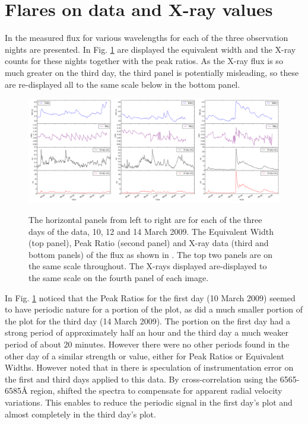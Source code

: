 \section{Flares on {\uves} data and X-ray values}
\protect\label{section:uvesflares}

In \citet[fig. 1 to fig. 3]{fuhrmeister11} the measured flux for various wavelengths for each of the three observation
nights are presented. In Fig. \ref{fig:uvrxp1} are displayed the {\ha} equivalent width and the X-ray counts for these
nights together with the peak ratios. As the X-ray flux is so much greater on the third day, the third panel is
potentially misleading, so these are re-displayed all to the same scale below in the bottom panel.

\begin{figure}[!htbp]
\begin{center}
\includegraphics[scale=0.18]{Figures/uvrx-onepic.png} \\
\end{center}   
\caption{The horizontal panels from left to right are for each of the three days of the {\uves} data, 10, 12 and 14
  March 2009.  The Equivalent Width (top panel), Peak Ratio (second panel) and X-ray data (third and bottom panels) of the
  {\ha} flux as shown in \citet[Fig. 1 to Fig.3]{fuhrmeister11}. The top two panels are on the same scale
  throughout. The X-rays displayed are-displayed to the same scale on the fourth panel of each image.}
 \protect\label{fig:uvrxp1}
\end{figure}

In Fig. \ref{fig:uvrxp1} {\Firstp} noticed that the Peak Ratios for the first day (10 March 2009) seemed to have periodic nature for a portion of
the plot, as did a much smaller portion of the plot for the third day (14 March 2009). The portion on the first day had
a strong period of approximately half an hour and the third day a much weaker period of about 20 minutes.  However there
were no other periods found in the other day of a similar strength or value, either for Peak Ratios or Equivalent
Widths. However {\Firstp} noted that in \citet[Section 4.1]{barnes14} there is speculation of instrumentation error on
the first and third days applied to this data. By cross-correlation using the 6565-6585{\AA} region, {\Firstp} shifted
the spectra to compensate for apparent radial velocity variations. This enables {\Firstobj} to reduce the periodic
signal in the first day's plot and almost completely in the third day's plot.


